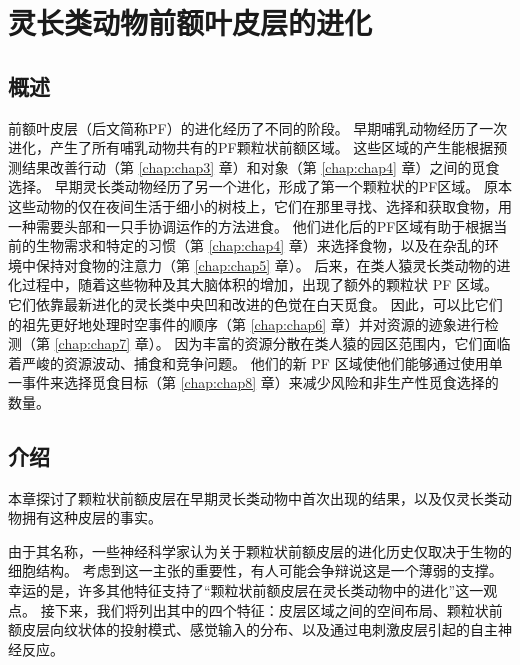 \chapter{灵长类动物前额叶皮层的进化} \label{chap:chap2}

\section{概述}
前额叶皮层（后文简称PF）的进化经历了不同的阶段。
早期哺乳动物经历了一次进化，产生了所有哺乳动物共有的PF颗粒状前额区域。
这些区域的产生能根据预测结果改善行动（第 \ref{chap:chap3} 章）和对象（第 \ref{chap:chap4} 章）之间的觅食选择。
早期灵长类动物经历了另一个进化，形成了第一个颗粒状的PF区域。
原本这些动物的仅在夜间生活于细小的树枝上，它们在那里寻找、选择和获取食物，用一种需要头部和一只手协调运作的方法进食。
他们进化后的PF区域有助于根据当前的生物需求和特定的习惯（第 \ref{chap:chap4} 章）来选择食物，以及在杂乱的环境中保持对食物的注意力（第 \ref{chap:chap5} 章）。
后来，在类人猿灵长类动物的进化过程中，随着这些物种及其大脑体积的增加，出现了额外的颗粒状 PF 区域。
它们依靠最新进化的灵长类中央凹和改进的色觉在白天觅食。 因此，可以比它们的祖先更好地处理时空事件的顺序（第 \ref{chap:chap6} 章）并对资源的迹象进行检测（第 \ref{chap:chap7} 章）。
因为丰富的资源分散在类人猿的园区范围内，它们面临着严峻的资源波动、捕食和竞争问题。
他们的新 PF 区域使他们能够通过使用单一事件来选择觅食目标（第 \ref{chap:chap8} 章）来减少风险和非生产性觅食选择的数量。

\section{介绍}
本章探讨了颗粒状前额皮层在早期灵长类动物中首次出现的结果，以及仅灵长类动物拥有这种皮层的事实\cite{preuss2007evolutionary}。

由于其名称，一些神经科学家认为关于颗粒状前额皮层的进化历史仅取决于生物的细胞结构。
考虑到这一主张的重要性，有人可能会争辩说这是一个薄弱的支撑。
幸运的是，许多其他特征支持了“颗粒状前额皮层在灵长类动物中的进化”这一观点。
接下来，我们将列出其中的四个特征：皮层区域之间的空间布局、颗粒状前额皮层向纹状体的投射模式、感觉输入的分布、以及通过电刺激皮层引起的自主神经反应。


